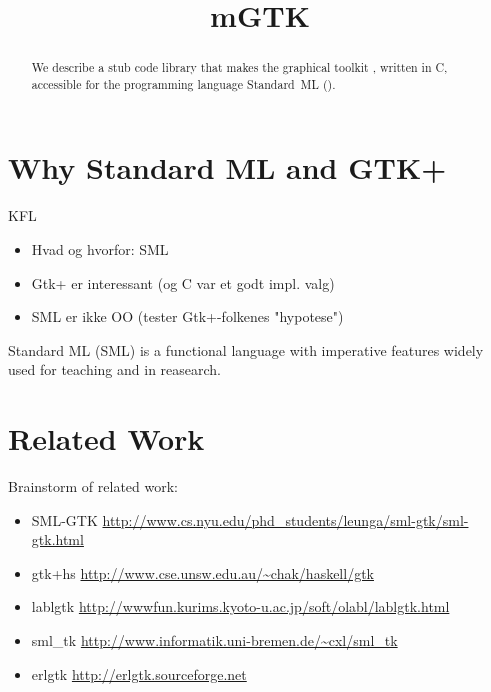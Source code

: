 \documentclass[workingdraft,endnotes]{usetex-v1}
\begin{document}
\title{mGTK}


\author{
\and
{}
%
} %

\maketitle

\begin{abstract}
  We describe \mgtk a stub code library that makes the graphical
  toolkit \gtk, written in C, accessible for the programming language
  Standard~ML (\sml).  
\end{abstract}


\section{Why Standard ML and GTK+}

\begin{ednote}{KFL}
  \begin{itemize}
  \item Hvad og hvorfor: SML  
  \item Gtk+ er interessant (og C var et godt
    impl. valg)  
  \item SML er ikke OO (tester Gtk+-folkenes "hypotese")
\end{itemize}
\end{ednote}

Standard ML (SML) is a functional language with imperative features
widely used for teaching and in reasearch. 



\section{Related Work}
\label{sec:related-work}

 Brainstorm of related work:
\begin{itemize}
\item SML-GTK 
\url{http://www.cs.nyu.edu/phd_students/leunga/sml-gtk/sml-gtk.html}

\item gtk+hs
\url{http://www.cse.unsw.edu.au/~chak/haskell/gtk}

\item lablgtk
\url{http://wwwfun.kurims.kyoto-u.ac.jp/soft/olabl/lablgtk.html}

\item sml\_tk
\url{http://www.informatik.uni-bremen.de/~cxl/sml_tk}

\item erlgtk
\url{http://erlgtk.sourceforge.net}

\end{itemize}
\end{document}
